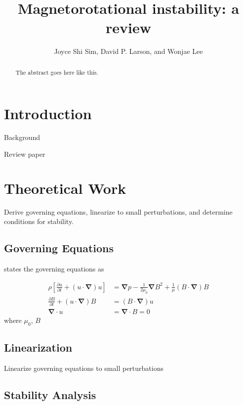 \documentclass[10pt]{jfm}
\title[Magnetorotational instability]{Magnetorotational instability: a review}
\author[J.~S. Sim, D.~P. Larson, and W. Lee]{Joyce Shi Sim, 
    David P. Larson, and Wonjae Lee}
\affiliation{University of California, San Diego}
\newcommand{\del}{\boldsymbol{\nabla}}
\begin{document}
\maketitle


\begin{abstract}
The abstract goes here like this.
\end{abstract}


\section{Introduction}
\label{sec:intro}
Background

Review paper \cite{Julien2010}



\section{Theoretical Work}
\label{sec:theory}
Derive governing equations, linearize to small perturbations, and determine 
conditions for stability.

\subsection{Governing Equations}
\cite{Julien2010} states the governing equations as

\begin{align}
    \rho \left[ \frac{\partial u}{\partial t} + (u \cdot \del) u \right] &= \del p - \frac{1}{2 \mu_0} \del B^2 + \frac{1}{\mu} (B \cdot \del) B \\
    \frac{\partial B}{\partial t} + (u \cdot \del) B &= (B \cdot \del) u \\
    \del \cdot u &= \del \cdot B = 0
\end{align}
where $\mu_0$, $B$


\subsection{Linearization}
Linearize governing equations to small perturbations


\subsection{Stability Analysis}
\end{document}
